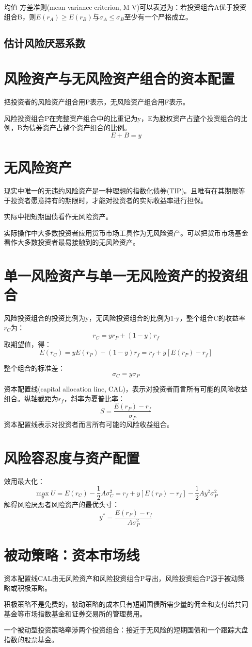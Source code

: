 \documentclass{article}
\begin{document}
均值-方差准则(mean-variance criterion, M-V)可以表述为：若投资组合A优于投资组合B，则$ E(r_A)\ge E(r_B) $与$ \sigma_A\le \sigma_B $至少有一个严格成立。

\subsection{估计风险厌恶系数}

\section{风险资产与无风险资产组合的资本配置}
把投资者的风险资产组合用P表示，无风险资产组合用F表示。

风险投资组合P在完整资产组合中的比重记为y，E为股权资产占整个投资组合的比例，B为债券资产占整个资产组合的比例。
\[
E+B=y
\]

\section{无风险资产}
现实中唯一的无违约风险资产是一种理想的指数化债券(TIP)。且唯有在其期限等于投资者愿意持有的期限时，才能对投资者的实际收益率进行担保。

实际中把短期国债看作无风险资产。

实际操作中大多数投资者应用货币市场工具作为无风险资产。可以把货币市场基金看作大多数投资者最易接触到的无风险资产。

\section{单一风险资产与单一无风险资产的投资组合}
风险投资组合的投资比例为y，无风险投资组合的比例为1-y，整个组合C的收益率$ r_C $为：
\[
r_C=yr_P+(1-y)r_f
\]
取期望值，得：
\[
E(r_C)=yE(r_P)+(1-y)r_f=r_f+y[E(r_P)-r_f]
\]

整个组合的标准差：
\[
\sigma_C=y\sigma_P
\]

资本配置线(capital allocation line, CAL)，表示对投资者而言所有可能的风险收益组合。纵轴截距为$ r_f $，斜率为夏普比率：
\[
S=\frac{E(r_P)-r_f}{\sigma_P}
\]
资本配置线表示对投资者而言所有可能的风险收益组合。

\section{风险容忍度与资产配置}
效用最大化：
\[
\max_y U=E(r_C)-\frac{1}{2}A\sigma^2_C=r_f+y[E(r_P)-r_f]-\frac{1}{2}Ay^2\sigma^2_P
\]
解得风险厌恶者风险资产的最优头寸：
\[
y^*=\frac{E(r_P)-r_f}{A\sigma^2_P}
\]

\section{被动策略：资本市场线}
资本配置线CAL由无风险资产和风险投资组合P导出，风险投资组合P源于被动策略或积极策略。

积极策略不是免费的，被动策略的成本只有短期国债所需少量的佣金和支付给共同基金等市场指数基金和证券交易所的管理费用。

一个被动型投资策略牵涉两个投资组合：接近于无风险的短期国债和一个跟踪大盘指数的股票基金。
\end{document}
